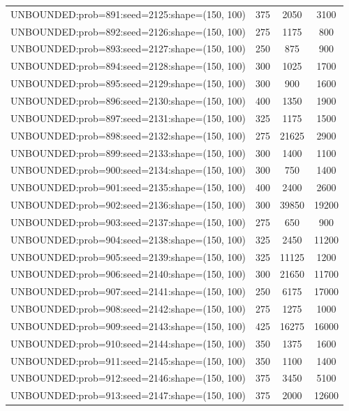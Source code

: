 \begin{longtable}{lccc}
UNBOUNDED:prob=891:seed=2125:shape=(150, 100) &      375 &  2050 &   3100 \\
UNBOUNDED:prob=892:seed=2126:shape=(150, 100) &      275 &  1175 &    800 \\
UNBOUNDED:prob=893:seed=2127:shape=(150, 100) &      250 &   875 &    900 \\
UNBOUNDED:prob=894:seed=2128:shape=(150, 100) &      300 &  1025 &   1700 \\
UNBOUNDED:prob=895:seed=2129:shape=(150, 100) &      300 &   900 &   1600 \\
UNBOUNDED:prob=896:seed=2130:shape=(150, 100) &      400 &  1350 &   1900 \\
UNBOUNDED:prob=897:seed=2131:shape=(150, 100) &      325 &  1175 &   1500 \\
UNBOUNDED:prob=898:seed=2132:shape=(150, 100) &      275 & 21625 &   2900 \\
UNBOUNDED:prob=899:seed=2133:shape=(150, 100) &      300 &  1400 &   1100 \\
UNBOUNDED:prob=900:seed=2134:shape=(150, 100) &      300 &   750 &   1400 \\
UNBOUNDED:prob=901:seed=2135:shape=(150, 100) &      400 &  2400 &   2600 \\
UNBOUNDED:prob=902:seed=2136:shape=(150, 100) &      300 & 39850 &  19200 \\
UNBOUNDED:prob=903:seed=2137:shape=(150, 100) &      275 &   650 &    900 \\
UNBOUNDED:prob=904:seed=2138:shape=(150, 100) &      325 &  2450 &  11200 \\
UNBOUNDED:prob=905:seed=2139:shape=(150, 100) &      325 & 11125 &   1200 \\
UNBOUNDED:prob=906:seed=2140:shape=(150, 100) &      300 & 21650 &  11700 \\
UNBOUNDED:prob=907:seed=2141:shape=(150, 100) &      250 &  6175 &  17000 \\
UNBOUNDED:prob=908:seed=2142:shape=(150, 100) &      275 &  1275 &   1000 \\
UNBOUNDED:prob=909:seed=2143:shape=(150, 100) &      425 & 16275 &  16000 \\
UNBOUNDED:prob=910:seed=2144:shape=(150, 100) &      350 &  1375 &   1600 \\
UNBOUNDED:prob=911:seed=2145:shape=(150, 100) &      350 &  1100 &   1400 \\
UNBOUNDED:prob=912:seed=2146:shape=(150, 100) &      375 &  3450 &   5100 \\
UNBOUNDED:prob=913:seed=2147:shape=(150, 100) &      375 &  2000 &  12600 \\

\end{longtable}
